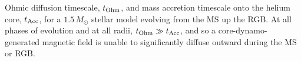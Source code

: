 \label{fig:timescales}
Ohmic diffusion timescale, $t_{\rm Ohm}$, and mass accretion timescale onto the helium core, $t_{\rm Acc}$, for a $1.5 \, M_\odot$ stellar model evolving from the MS up the RGB. At all phases of evolution and at all radii, $t_{\rm Ohm} \gg t_{\rm Acc}$, and so a core-dynamo-generated magnetic field is unable to significantly diffuse outward during the MS or RGB.
  